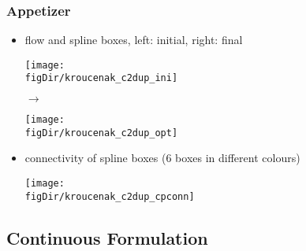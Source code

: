 \documentclass[10pt,t]{beamer}
\def\figDir{figures}
\begin{document}
\begin{frame}
  \frametitle{Appetizer}
  \vspace*{-3mm}
  \begin{itemize}
  \item flow and spline boxes, left: initial, right: final \\
    \noindent
    \hspace*{-5mm}
      \begin{minipage}{0.48\linewidth}
        \texttt{[image: \\figDir/kroucenak\_c2dup\_ini]}
      \end{minipage}
      $\rightarrow$
      \begin{minipage}{0.48\linewidth}
        \texttt{[image: \\figDir/kroucenak\_c2dup\_opt]}
      \end{minipage}
    \item connectivity of spline boxes (6 boxes in different colours)
    \begin{center}
      \begin{minipage}{0.4\linewidth}
        \texttt{[image: \\figDir/kroucenak\_c2dup\_cpconn]}
      \end{minipage}
    \end{center}
  \end{itemize}
\end{frame}


\subsection{Continuous Formulation}
\end{document}
